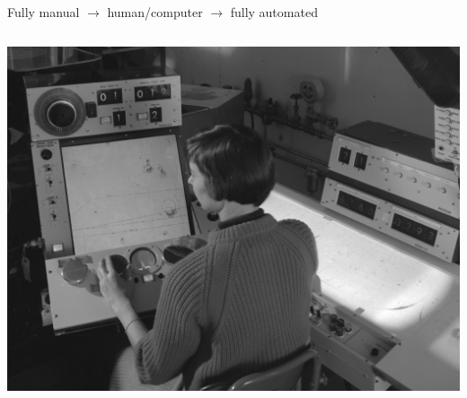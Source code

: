 \documentclass[aspectratio=169]{beamer}
\begin{document}
\begin{frame}{Fully manual $\to$ human/computer $\to$ fully automated}
\begin{columns}[b]
\vspace{0.2 cm}
\includegraphics[width=\linewidth]{franckenstein-3.jpg}
\end{columns}
\end{frame}
\end{document}
